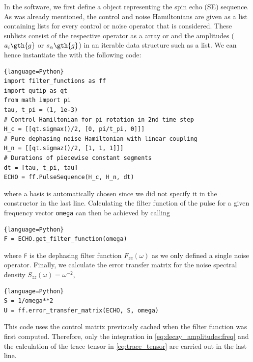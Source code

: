In the software, we first define a \pulsesequence object representing the spin echo (SE) sequence. As was already mentioned, the control and noise Hamiltonians are given as a list containing lists for every control or noise operator that is considered. These sublists consist of the respective operator as a \numpy array or \qutip \qobj and the amplitudes ($a_i\gth{g}$ or $s_\alpha\gth{g}$) in an iterable data structure such as a list. We can hence instantiate the \pulsesequence with the following code:
\begin{lstlisting}{language=Python}
import filter_functions as ff
import qutip as qt
from math import pi
tau, t_pi = (1, 1e-3)
# Control Hamiltonian for pi rotation in 2nd time step
H_c = [[qt.sigmax()/2, [0, pi/t_pi, 0]]]
# Pure dephasing noise Hamiltonian with linear coupling
H_n = [[qt.sigmaz()/2, [1, 1, 1]]]
# Durations of piecewise constant segments
dt = [tau, t_pi, tau]
ECHO = ff.PulseSequence(H_c, H_n, dt)
\end{lstlisting}
where a basis is automatically chosen since we did not specify it in the constructor in the last line. Calculating the filter function of the pulse for a given frequency vector \verb|omega| can then be achieved by calling
\begin{lstlisting}{language=Python}
F = ECHO.get_filter_function(omega)
\end{lstlisting}
where \verb|F| is the dephasing filter function $F_{zz}(\omega)$ as we only defined a single noise operator. Finally, we calculate the error transfer matrix \liouvUe for the noise spectral density $S_{zz}(\omega) = \omega^{-2}$,
\begin{lstlisting}{language=Python}
S = 1/omega**2
U = ff.error_transfer_matrix(ECHO, S, omega)
\end{lstlisting}
This code uses the control matrix previously cached when the filter function was first computed. Therefore, only the integration in \cref{eq:decay_amplitudes:freq} and the calculation of the trace tensor in \cref{eq:trace_tensor} are carried out in the last line.

